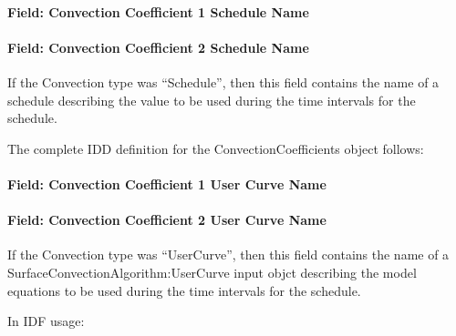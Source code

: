 \paragraph{Field: Convection Coefficient 1 Schedule Name}\label{field-convection-coefficient-1-schedule-name}

\paragraph{Field: Convection Coefficient 2 Schedule Name}\label{field-convection-coefficient-2-schedule-name}

If the Convection type was ``Schedule'', then this field contains the name of a schedule describing the value to be used during the time intervals for the schedule.

The complete IDD definition for the ConvectionCoefficients object follows:

\paragraph{Field: Convection Coefficient 1 User Curve Name}\label{field-convection-coefficient-1-user-curve-name}

\paragraph{Field: Convection Coefficient 2 User Curve Name}\label{field-convection-coefficient-2-user-curve-name}

If the Convection type was ``UserCurve'', then this field contains the name of a SurfaceConvectionAlgorithm:UserCurve input objct describing the model equations to be used during the time intervals for the schedule.

In IDF usage:

